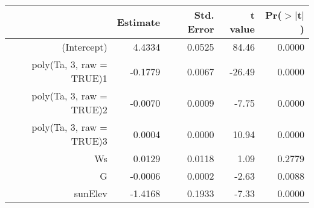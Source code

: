 \begin{tabular}{rrrrr}
  \hline
 & Estimate & Std. Error & t value & Pr($>$$|$t$|$) \\ 
  \hline
(Intercept) & 4.4334 & 0.0525 & 84.46 & 0.0000 \\ 
  poly(Ta, 3, raw = TRUE)1 & -0.1779 & 0.0067 & -26.49 & 0.0000 \\ 
  poly(Ta, 3, raw = TRUE)2 & -0.0070 & 0.0009 & -7.75 & 0.0000 \\ 
  poly(Ta, 3, raw = TRUE)3 & 0.0004 & 0.0000 & 10.94 & 0.0000 \\ 
  Ws & 0.0129 & 0.0118 & 1.09 & 0.2779 \\ 
  G & -0.0006 & 0.0002 & -2.63 & 0.0088 \\ 
  sunElev & -1.4168 & 0.1933 & -7.33 & 0.0000 \\ 
   \hline
\end{tabular}
